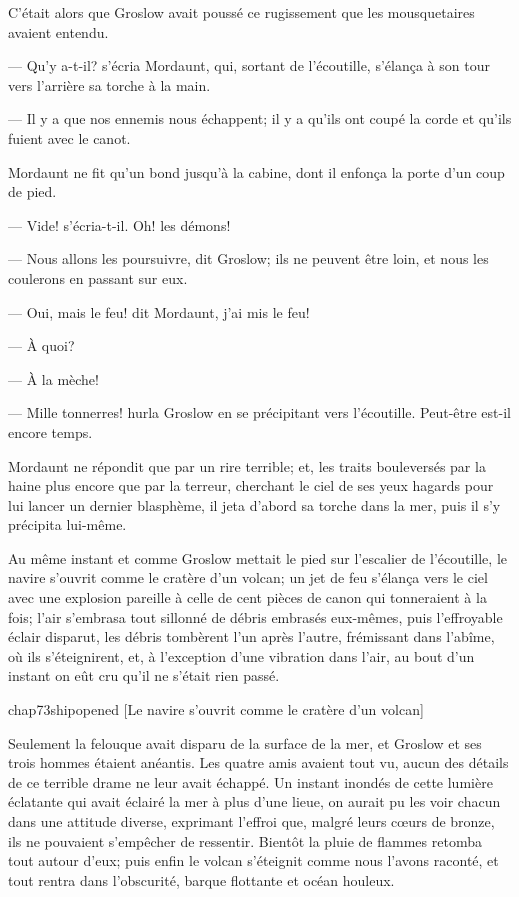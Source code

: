 C'était alors que Groslow avait poussé ce rugissement que les mousquetaires avaient entendu.

— Qu'y a-t-il? s'écria Mordaunt, qui, sortant de l'écoutille, s'élança à son tour vers l'arrière sa torche à la main.

— Il y a que nos ennemis nous échappent; il y a qu'ils ont coupé la corde et qu'ils fuient avec le canot.

Mordaunt ne fit qu'un bond jusqu'à la cabine, dont il enfonça la porte d'un coup de pied.

— Vide! s'écria-t-il. Oh! les démons!

— Nous allons les poursuivre, dit Groslow; ils ne peuvent être loin, et nous les coulerons en passant sur eux.

— Oui, mais le feu! dit Mordaunt, j'ai mis le feu!

— À quoi?

— À la mèche!

— Mille tonnerres! hurla Groslow en se précipitant vers l'écoutille. Peut-être est-il encore temps.

Mordaunt ne répondit que par un rire terrible; et, les traits bouleversés par la haine plus encore que par la terreur, cherchant le ciel de ses yeux hagards pour lui lancer un dernier blasphème, il jeta d'abord sa torche dans la mer, puis il s'y précipita lui-même.

Au même instant et comme Groslow mettait le pied sur l'escalier de l'écoutille, le navire s'ouvrit comme le cratère d'un volcan; un jet de feu s'élança vers le ciel avec une explosion pareille à celle de cent pièces de canon qui tonneraient à la fois; l'air s'embrasa tout sillonné de débris embrasés eux-mêmes, puis l'effroyable éclair disparut, les débris tombèrent l'un après l'autre, frémissant dans l'abîme, où ils s'éteignirent, et, à l'exception d'une vibration dans l'air, au bout d'un instant on eût cru qu'il ne s'était rien passé.

\begin{bwbigpic}
	[\basicscale] 
	{chap73shipopened}
	[Le navire s'ouvrit comme le cratère d'un volcan]
\end{bwbigpic}

Seulement la felouque avait disparu de la surface de la mer, et Groslow et ses trois hommes étaient anéantis.
Les quatre amis avaient tout vu, aucun des détails de ce terrible drame ne leur avait échappé. Un instant inondés de cette lumière éclatante qui avait éclairé la mer à plus d'une lieue, on aurait pu les voir chacun dans une attitude diverse, exprimant l'effroi que, malgré leurs cœurs de bronze, ils ne pouvaient s'empêcher de ressentir. Bientôt la pluie de flammes retomba tout autour d'eux; puis enfin le volcan s'éteignit comme nous l'avons raconté, et tout rentra dans l'obscurité, barque flottante et océan houleux.


